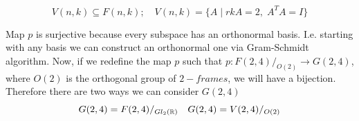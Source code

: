 \documentclass[11pt,a4paper]{report}
\begin{document}
$$V(n,k) \subseteq F(n,k); \quad V(n,k) = \{ A \; | \; rkA=2, \; A^T A = I \}$$
\begin{center}
\end{center}
Map $p$ is surjective because every subspace has an orthonormal basis.
I.e. starting with any basis we can construct an orthonormal one via Gram-Schmidt algorithm.
Now, if we redefine the map $p$ such that $p: { F(2,4) / _{O(2)}} \to G(2,4)$, where $O(2)$
is the orthogonal group of $2-frames$, we will have a bijection. 
Therefore there are two ways we can consider $G(2,4)$
$$ G(2,4) = F(2,4) / _{Gl_2(\mathbb{R})} \quad G(2,4) = V(2,4) / _{O(2) }$$
\end{document}
